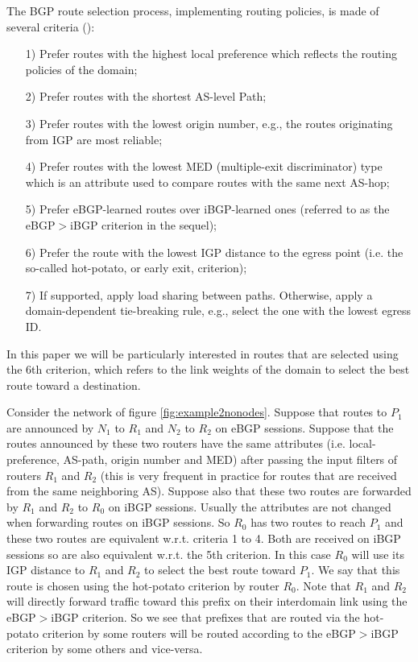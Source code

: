 \documentclass{acm_proc_article-sp}
\begin{document}
The BGP route selection process, implementing routing policies, is made of several criteria (\cite{bgp2,bgp3}):
\begin{itemize}
\item[1)] Prefer routes with the highest local preference which reflects the
  routing policies of the domain;
\item[2)] Prefer routes with the shortest AS-level Path;
\item[3)] Prefer routes with the lowest origin number, e.g., the routes
  originating from IGP are most reliable;
\item[4)] Prefer routes with the lowest MED (multiple-exit discriminator) type
  which is an attribute used to compare routes with the same next AS-hop;
\item[5)] Prefer eBGP-learned routes over iBGP-learned ones 
(referred to as the eBGP$>$iBGP criterion in the sequel);
\item[6)] Prefer the route with the lowest IGP distance to the egress point (i.e. the so-called 
hot-potato, or early exit, criterion);
\item[7)] If supported, apply load sharing between paths. Otherwise, apply a
  domain-dependent tie-breaking rule, e.g., select the one with the lowest
  egress ID.
\end{itemize}

In this paper we will be particularly interested in routes that
are selected using the 6th criterion, which refers to the link weights of the
domain to select the best route toward a destination.

Consider the network of figure \ref{fig:example2nonodes}. Suppose that routes
to $P_1$ are announced by $N_1$ to $R_1$ and $N_2$ to $R_2$ on eBGP
sessions. Suppose that the routes announced by these two routers have
the same attributes (i.e. local-preference, AS-path, origin number and
MED) after passing the input filters of routers $R_1$ and $R_2$ (this
is very frequent in practice for routes that are received from the
same neighboring AS). Suppose also that these two routes are forwarded
by $R_1$ and $R_2$ to $R_0$ on iBGP sessions. Usually the attributes
are not changed when forwarding routes on iBGP sessions. So $R_0$ has
two routes to reach $P_1$ and these two routes are equivalent
w.r.t. criteria 1 to 4. Both are
received on iBGP sessions so are also equivalent w.r.t. the 5th criterion. In
this case $R_0$ will use its IGP distance to $R_1$ and $R_2$ to select
the best route toward $P_1$. We say that this route is
chosen using the hot-potato criterion by router $R_0$. Note that $R_1$
and $R_2$ will directly forward traffic toward this prefix on their interdomain link
using the eBGP$>$iBGP criterion. So we see that prefixes that are
routed via the hot-potato criterion by some routers will be routed according to
the eBGP$>$iBGP criterion by some others and vice-versa.
\end{document}
